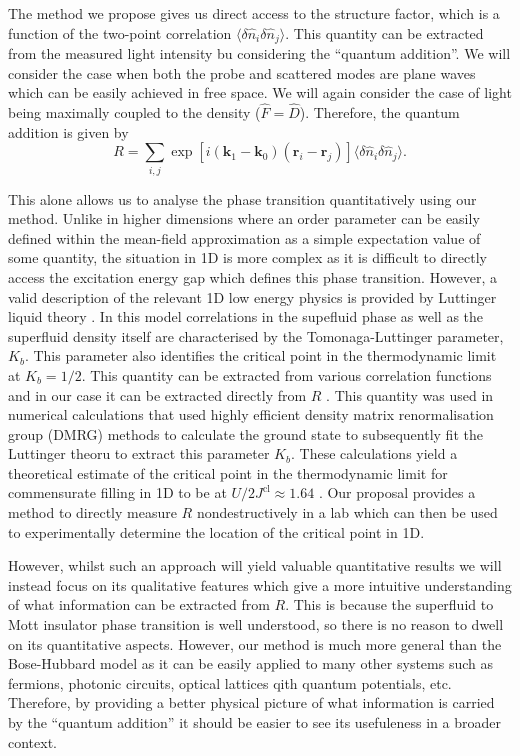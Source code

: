 The method we propose gives us direct access to the structure factor,
which is a function of the two-point correlation $\langle \delta
\hat{n}_i \delta \hat{n}_j \rangle$. This quantity can be extracted
from the measured light intensity bu considering the ``quantum
addition''. We will consider the case when both the probe and
scattered modes are plane waves which can be easily achieved in free
space. We will again consider the case of light being maximally
coupled to the density ($\hat{F} = \hat{D}$). Therefore, the quantum
addition is given by
\begin{equation} 
  R =\sum_{i, j} \exp[i (\mathbf{k}_1 - \mathbf{k}_0)
  (\mathbf{r}_i - \mathbf{r}_j)] \langle \delta \hat{n}_i \delta
  \hat{n}_j \rangle.
\end{equation}


This alone allows us to analyse the phase transition quantitatively
using our method. Unlike in higher dimensions where an order parameter
can be easily defined within the mean-field approximation as a simple
expectation value of some quantity, the situation in 1D is more
complex as it is difficult to directly access the excitation energy
gap which defines this phase transition. However, a valid description
of the relevant 1D low energy physics is provided by Luttinger liquid
theory \cite{giamarchi}. In this model correlations in the supefluid
phase as well as the superfluid density itself are characterised by
the Tomonaga-Luttinger parameter, $K_b$. This parameter also
identifies the critical point in the thermodynamic limit at $K_b =
1/2$. This quantity can be extracted from various correlation
functions and in our case it can be extracted directly from $R$
\cite{ejima2011}. This quantity was used in numerical calculations
that used highly efficient density matrix renormalisation group (DMRG)
methods to calculate the ground state to subsequently fit the
Luttinger theoru to extract this parameter $K_b$. These calculations
yield a theoretical estimate of the critical point in the
thermodynamic limit for commensurate filling in 1D to be at
$U/2J^\text{cl} \approx 1.64$ \cite{ejima2011}. Our proposal provides
a method to directly measure $R$ nondestructively in a lab which can
then be used to experimentally determine the location of the critical
point in 1D.

However, whilst such an approach will yield valuable quantitative
results we will instead focus on its qualitative features which give a
more intuitive understanding of what information can be extracted from
$R$. This is because the superfluid to Mott insulator phase transition
is well understood, so there is no reason to dwell on its quantitative
aspects. However, our method is much more general than the
Bose-Hubbard model as it can be easily applied to many other systems
such as fermions, photonic circuits, optical lattices qith quantum
potentials, etc. Therefore, by providing a better physical picture of
what information is carried by the ``quantum addition'' it should be
easier to see its usefuleness in a broader context.


